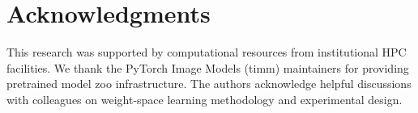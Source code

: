 \section*{Acknowledgments}

This research was supported by computational resources from institutional HPC facilities. We thank the PyTorch Image Models (timm) maintainers for providing pretrained model zoo infrastructure. The authors acknowledge helpful discussions with colleagues on weight-space learning methodology and experimental design.
